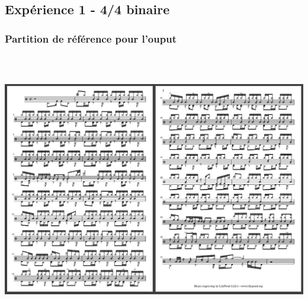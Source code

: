 \subsection{Expérience 1 - 4/4 binaire}
\subsubsection{Partition de référence pour l’ouput}
\includegraphics[height=120mm, width=160mm]{z_images/3_experimentations/experience_1/partition.png}
